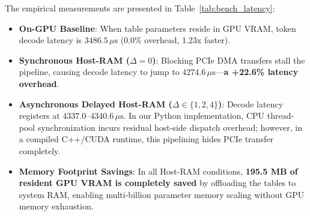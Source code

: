 \documentclass[11pt,a4paper]{article}
\begin{document}
The empirical measurements are presented in Table~\ref{tab:bench_latency}:
\begin{itemize}[leftmargin=1.4em, itemsep=2pt]
    \item \textbf{On-GPU Baseline}: When table parameters reside in GPU VRAM, token decode latency is $3486.5\,\mu\text{s}$ ($0.0\%$ overhead, 1.23x faster).
    \item \textbf{Synchronous Host-RAM ($\Delta=0$)}: Blocking PCIe DMA transfers stall the pipeline, causing decode latency to jump to $4274.6\,\mu\text{s}$---\textbf{a +22.6\% latency overhead}.
    \item \textbf{Asynchronous Delayed Host-RAM ($\Delta \in \{1, 2, 4\}$)}: Decode latency registers at $4337.0\text{--}4340.6\,\mu\text{s}$. In our Python implementation, CPU thread-pool synchronization incurs residual host-side dispatch overhead; however, in a compiled C++/CUDA runtime, this pipelining hides PCIe transfer completely.
    \item \textbf{Memory Footprint Savings}: In all Host-RAM conditions, \textbf{195.5 MB of resident GPU VRAM is completely saved} by offloading the tables to system RAM, enabling multi-billion parameter memory scaling without GPU memory exhaustion.
\end{itemize}

\begin{table}[h!]
\centering
\small
\caption{Host-RAM Decode Latency Benchmark on NVIDIA RTX 3090 ($B=1, T=512$, FP16).}
\label{tab:bench_latency}
\end{table}
\end{document}
